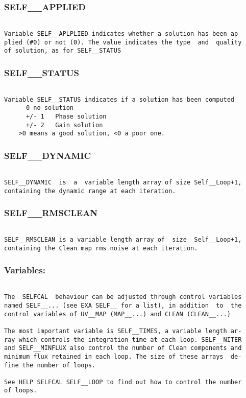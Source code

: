 \subsubsection{SELF\_\_APPLIED}
\begin{verbatim}

Variable SELF__APLPLIED indicates whether a solution has been ap-
plied (#0) or not (0). The value indicates the type  and  quality
of solution, as for SELF__STATUS

\end{verbatim}
\subsubsection{SELF\_\_STATUS}
\begin{verbatim}

Variable SELF__STATUS indicates if a solution has been computed
      0 no solution
      +/- 1   Phase solution
      +/- 2   Gain solution
    >0 means a good solution, <0 a poor one.
\end{verbatim}
\subsubsection{SELF\_\_DYNAMIC}
\begin{verbatim}

SELF__DYNAMIC  is  a  variable length array of size Self__Loop+1,
containing the dynamic range at each iteration.

\end{verbatim}
\subsubsection{SELF\_\_RMSCLEAN}
\begin{verbatim}

SELF__RMSCLEAN is a variable length array of  size  Self__Loop+1,
containing the Clean map rms noise at each iteration.

\end{verbatim}
\subsubsection{Variables:}
\begin{verbatim}

The  SELFCAL  behaviour can be adjusted through control variables
named SELF__... (see EXA SELF__ for a list), in addition  to  the
control variables of UV__MAP (MAP__...) and CLEAN (CLEAN__...)

The most important variable is SELF__TIMES, a variable length ar-
ray which controls the integration time at each loop. SELF__NITER
and SELF__MINFLUX also control the number of Clean components and
minimum flux retained in each loop. The size of these arrays  de-
fine the number of loops.

See HELP SELFCAL SELF__LOOP to find out how to control the number
of loops.

\end{verbatim}
